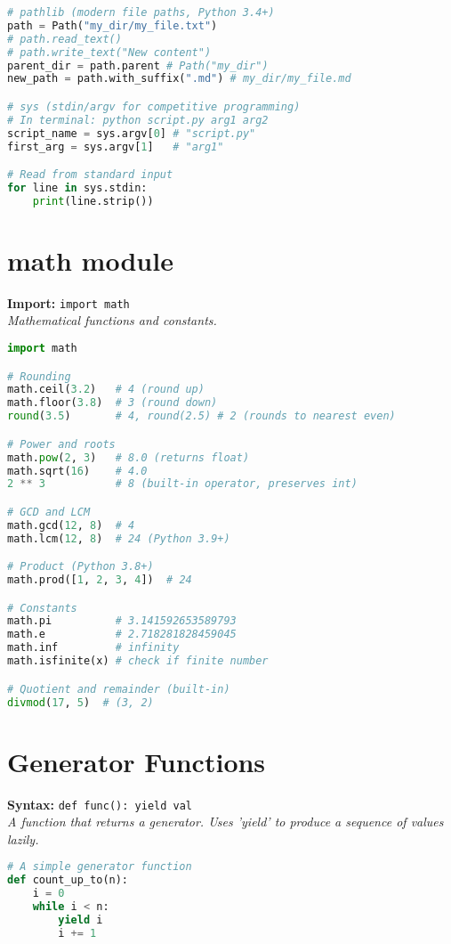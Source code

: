 \documentclass[8pt,landscape]{article}
\begin{document}
\begin{multicols}{3}
\begin{lstlisting}[language=Python]
# pathlib (modern file paths, Python 3.4+)
path = Path("my_dir/my_file.txt")
# path.read_text()
# path.write_text("New content")
parent_dir = path.parent # Path("my_dir")
new_path = path.with_suffix(".md") # my_dir/my_file.md

# sys (stdin/argv for competitive programming)
# In terminal: python script.py arg1 arg2
script_name = sys.argv[0] # "script.py"
first_arg = sys.argv[1]   # "arg1"

# Read from standard input
for line in sys.stdin:
    print(line.strip())
\end{lstlisting}

\section*{math module}
\textbf{Import:} \lstinline|import math| \\
\textit{Mathematical functions and constants.}
\begin{lstlisting}[language=Python]
import math

# Rounding
math.ceil(3.2)   # 4 (round up)
math.floor(3.8)  # 3 (round down)
round(3.5)       # 4, round(2.5) # 2 (rounds to nearest even)

# Power and roots
math.pow(2, 3)   # 8.0 (returns float)
math.sqrt(16)    # 4.0
2 ** 3           # 8 (built-in operator, preserves int)

# GCD and LCM
math.gcd(12, 8)  # 4
math.lcm(12, 8)  # 24 (Python 3.9+)

# Product (Python 3.8+)
math.prod([1, 2, 3, 4])  # 24

# Constants
math.pi          # 3.141592653589793
math.e           # 2.718281828459045
math.inf         # infinity
math.isfinite(x) # check if finite number

# Quotient and remainder (built-in)
divmod(17, 5)  # (3, 2)
\end{lstlisting}

\section*{Generator Functions}
\textbf{Syntax:} \lstinline|def func(): yield val| \\
\textit{A function that returns a generator. Uses 'yield' to produce a sequence of values lazily.}
\begin{lstlisting}[language=Python]
# A simple generator function
def count_up_to(n):
    i = 0
    while i < n:
        yield i
        i += 1


\end{lstlisting}
\end{multicols}
\end{document}
